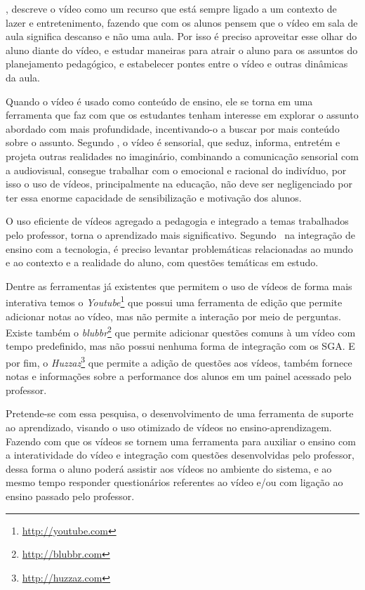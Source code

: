 , descreve o vídeo como um recurso que está sempre ligado a um contexto de lazer e entretenimento, fazendo que com os alunos pensem que o vídeo em sala de aula significa descanso e não uma aula. Por isso é preciso aproveitar esse olhar do aluno diante do vídeo, e estudar maneiras para atrair o aluno para os assuntos do planejamento pedagógico, e estabelecer pontes entre o vídeo e outras dinâmicas da aula.

Quando o vídeo é usado como conteúdo de ensino, ele se torna em uma ferramenta que faz com que os estudantes tenham interesse em explorar o assunto abordado com mais profundidade, incentivando-o a buscar por mais conteúdo sobre o assunto. Segundo \cite{moran}, o vídeo é sensorial, que seduz, informa, entretém e projeta outras realidades no imaginário, combinando a comunicação sensorial com a audiovisual, consegue trabalhar com o emocional e racional do indivíduo, por isso o uso de vídeos, principalmente na educação, não deve ser negligenciado por ter essa enorme capacidade de sensibilização e motivação dos alunos.

O uso eficiente de vídeos agregado a pedagogia e integrado a temas trabalhados pelo professor, torna o aprendizado mais significativo. Segundo~\cite{almeida} na integração de ensino com a tecnologia, é preciso levantar problemáticas relacionadas ao mundo e ao contexto e a realidade do aluno, com questões temáticas em estudo.

Dentre as ferramentas já existentes que permitem o uso de vídeos de forma mais interativa temos o \textit{Youtube}\footnote{\url{http://youtube.com}} que possui uma ferramenta de edição que permite adicionar notas ao vídeo, mas não permite a interação por meio de perguntas. Existe também o \textit{blubbr}\footnote{\url{http://blubbr.com}} que permite adicionar questões comuns à um vídeo com tempo predefinido, mas não possui nenhuma forma de integração com os \ac{SGA}. E por fim, o \textit{Huzzaz}\footnote{\url{http://huzzaz.com}} que permite a adição de questões aos vídeos, também fornece notas e informações sobre a performance dos alunos em um painel acessado pelo professor.

Pretende-se com essa pesquisa, o desenvolvimento de uma ferramenta de suporte ao aprendizado, visando o uso otimizado de vídeos no ensino-aprendizagem. Fazendo com que os vídeos se tornem uma ferramenta para auxiliar o ensino com a interatividade do vídeo e integração com questões desenvolvidas pelo professor, dessa forma o aluno poderá assistir aos vídeos no ambiente do sistema, e ao mesmo tempo responder questionários referentes ao vídeo e/ou com ligação ao ensino passado pelo professor.

